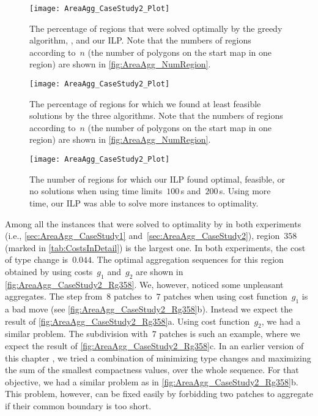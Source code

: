 \begin{figure}[tb]
\centering
\texttt{[image: AreaAgg\_CaseStudy2\_Plot]}
\caption{The percentage of regions that were solved 
	optimally by the greedy algorithm, \Astar, and our ILP.
	Note that the numbers of regions according to~$n$ 
	(the number of polygons on the start map in one region) 
	are shown in \fig\ref{fig:AreaAgg_NumRegion}.}
\label{fig:AreaAgg_CaseStudy2_Percentage_Optimal}
%
\par\vspace{\baselineskip} %
%
\centering
\texttt{[image: AreaAgg\_CaseStudy2\_Plot]}
\caption{The percentage of regions for which we found at 
	least feasible solutions by the three algorithms.
	Note that the numbers of regions according to~$n$ 
	(the number of polygons on the start map in one region) 
	are shown in \fig\ref{fig:AreaAgg_NumRegion}.}
\label{fig:AreaAgg_CaseStudy2_Percentage_Feasible}
\end{figure}

\begin{figure}[tb]
\centering
\texttt{[image: AreaAgg\_CaseStudy2\_Plot]}
\caption{The number of regions for which
	our ILP found optimal, feasible, or no solutions 
	when using time limits~$100\,$s and~$200\,$s.
	Using more time, our ILP was able to 
	solve more instances to optimality.}
\label{fig:AreaAgg_CaseStudy2_ILP}
\end{figure}

Among all the instances that were solved to optimality by \Astar
in both experiments (i.e., \sects\ref{sec:AreaAgg_CaseStudy1} 
and~\ref{sec:AreaAgg_CaseStudy2}),
region~$358$
(marked in \tab\ref{tab:CostsInDetail})
is the largest one.
In both experiments, the cost of type change is~$0.044$.
The optimal aggregation sequences for this region
obtained by using costs~$g_1$ and~$g_2$
are shown in \fig\ref{fig:AreaAgg_CaseStudy2_Rg358}.
We, however, noticed some unpleasant aggregates.
The step from~$8$ patches to~$7$ patches 
when using cost function~$g_1$ is a bad move
(see \fig\ref{fig:AreaAgg_CaseStudy2_Rg358}b).
Instead we expect the result of 
\fig\ref{fig:AreaAgg_CaseStudy2_Rg358}a.
Using cost function~$g_2$, we had a similar problem. 
The subdivision with~$7$ patches is such an example,
where we expect the result of 
\fig\ref{fig:AreaAgg_CaseStudy2_Rg358}c.
In an earlier version of this chapter \parencite{Peng2017AStar},
we tried a combination of minimizing type changes 
and maximizing the sum of the smallest compactness values, 
over the whole sequence.
For that objective, we had a similar problem as 
in \fig\ref{fig:AreaAgg_CaseStudy2_Rg358}b.
This problem, however, can be fixed easily 
by forbidding two patches to aggregate 
if their common boundary is too short.


